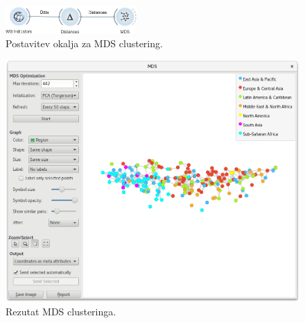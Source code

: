\begin{figure}
\begin{center}
\includegraphics[width=5cm]{pic/cluster_setup.png}
\end{center}
\caption{Postavitev okalja za MDS clustering.}
\label{cluster_indicators}
\end{figure} 

\begin{figure}
\begin{center}
\includegraphics[width=12cm]{pic/cluster_mds_result.png}
\end{center}
\caption{Rezutat MDS clusteringa.}
\label{cluster_indicators}
\end{figure} 
